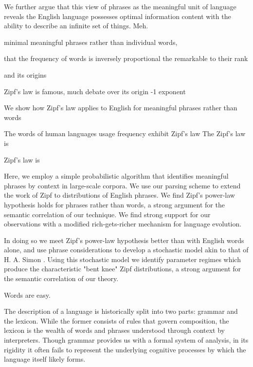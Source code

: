 We further argue that this view of phrases as the meaningful unit of
language reveals the English language possesses
optimal information content with 
the ability to describe an infinite set of things.  Meh.

minimal meaningful phrases rather than individual words,





that the frequency of words is inversely proportional
the remarkable 
to their rank



and its origins

Zipf's law is famous, much debate over its origin
-1 exponent
 
 
We show how Zipf's law applies to English for
meaningful phrases rather than words
 




The words of human languages 
usage frequency
exhibit  Zipf's law
The Zipf's law is 

Zipf's law is 

Here, we employ a simple probabilistic algorithm
that identifies meaningful phrases by context in large-scale
corpora.
We use our parsing scheme to extend the work
of Zipf  to distributions of English phrases.
We find Zipf's power-law hypothesis holds for phrases
rather than words, 
a strong argument for the semantic correlation of our technique.
We find strong support for our observations 
with a modified rich-gets-richer 
mechanism for language evolution.

In doing so we meet Zipf's power-law hypothesis better than
with English words alone, and use phrase considerations to develop a
stochastic model akin to that of H. A. Simon \cite{Simon01}.  
Using
this stochastic model we identify parameter regimes which produce the
characteristic "bent knee" Zipf distributions, a strong argument for
the semantic correlation of our theory.


Words are easy.

The description of a language is historically split into two parts:
grammar and the lexicon.
While the former consists of rules that
govern composition, the lexicon is the wealth of words and phrases
understood through context by interpreters.
Though grammar provides us
with a formal system of analysis, in its rigidity it often fails to
represent the underlying cognitive processes by which the language
itself likely forms.


